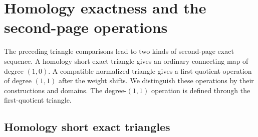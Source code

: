 \section{Homology exactness and the second-page operations}
The preceding triangle comparisons lead to two kinds of second-page
exact sequence. A homology short exact triangle gives an ordinary
connecting map of degree $(1,0)$. A compatible normalized triangle gives
a first-quotient operation of degree $(1,1)$ after the weight shifts.
We distinguish these operations by their constructions and domains.
The degree-$(1,1)$ operation is defined through the first-quotient triangle.

\subsection{Homology short exact triangles}

